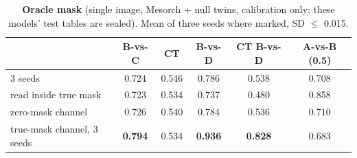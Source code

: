 \begin{table}[t]
\centering
\caption{\textbf{Oracle mask} (single image, Mesorch + null twins, calibration only; these models' test tables are sealed). Mean of three seeds where marked, SD $\leq$ 0.015. %
}
\label{tab:oracle}
\footnotesize
\setlength{\tabcolsep}{3pt}
\begin{tabular}{@{}lccccc@{}}
\toprule
 & B-vs-C & CT & B-vs-D & CT B-vs-D & A-vs-B (0.5) \\
\midrule
3 seeds & 0.724 & 0.546 & 0.786 & 0.538 & 0.708 \\ %
\quad read inside true mask & 0.723 & 0.534 & 0.737 & 0.480 & 0.858 \\ %
zero-mask channel & 0.726 & 0.540 & 0.784 & 0.536 & 0.710 \\ %
true-mask channel, 3 seeds & \textbf{0.794} & 0.534 & \textbf{0.936} & \textbf{0.828} & 0.683 \\ %
\bottomrule
\end{tabular}
\end{table}

